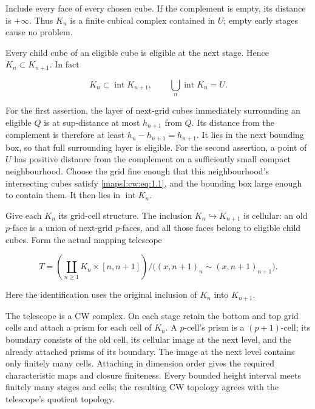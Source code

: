 \documentclass[11pt]{article}
\begin{document}
Include every face of every chosen cube. If the complement is empty, its distance is \(+\infty\). Thus \(K_n\) is a finite cubical complex contained in \(U\); empty early stages cause no problem.

Every child cube of an eligible cube is eligible at the next stage. Hence \(K_n\subset K_{n+1}\). In fact

\begin{equation}
K_n\subset\operatorname{int}K_{n+1},
\qquad
\bigcup_n\operatorname{int}K_n=U.
\label{mapsI:cw:eq:1.2}
\end{equation}

For the first assertion, the layer of next-grid cubes immediately surrounding an eligible \(Q\) is at sup-distance at most \(h_{n+1}\) from \(Q\). Its distance from the complement is therefore at least \(h_n-h_{n+1}=h_{n+1}\). It lies in the next bounding box, so that full surrounding layer is eligible. For the second assertion, a point of \(U\) has positive distance from the complement on a sufficiently small compact neighbourhood. Choose the grid fine enough that this neighbourhood's intersecting cubes satisfy \eqref{mapsI:cw:eq:1.1}, and the bounding box large enough to contain them. It then lies in \(\operatorname{int}K_n\).

Give each \(K_n\) its grid-cell structure. The inclusion \(K_n\hookrightarrow K_{n+1}\) is cellular: an old \(p\)-face is a union of next-grid \(p\)-faces, and all those faces belong to eligible child cubes. Form the actual mapping telescope

\begin{equation}
T=\left(\coprod_{n\geq1}K_n\times[n,n+1]\right)\big/\bigl((x,n+1)_n\sim(x,n+1)_{n+1}\bigr).
\label{mapsI:cw:eq:1.3}
\end{equation}

Here the identification uses the original inclusion of \(K_n\) into \(K_{n+1}\).

The telescope is a CW complex. On each stage retain the bottom and top grid cells and attach a prism for each cell of \(K_n\). A \(p\)-cell's prism is a \((p+1)\)-cell; its boundary consists of the old cell, its cellular image at the next level, and the already attached prisms of its boundary. The image at the next level contains only finitely many cells. Attaching in dimension order gives the required characteristic maps and closure finiteness. Every bounded height interval meets finitely many stages and cells; the resulting CW topology agrees with the telescope's quotient topology.
\end{document}
